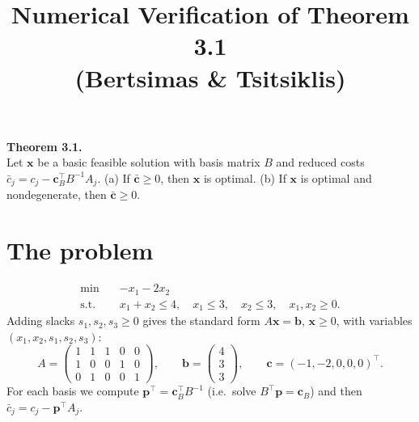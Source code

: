 \documentclass[11pt]{article}
\title{Numerical Verification of Theorem 3.1\\(Bertsimas \& Tsitsiklis)}
\date{}
\newcommand{\cb}{\bar{\mathbf c}}
\newcommand{\bx}{\mathbf x}
\begin{document}
\maketitle

\noindent\textbf{Theorem 3.1.} \\ Let $\bx$ be a basic feasible solution with basis matrix $B$ and reduced costs
$\bar c_j = c_j - \mathbf c_B^\top B^{-1}A_j$.
(a) If $\cb\ge 0$, then $\bx$ is optimal.
(b) If $\bx$ is optimal and nondegenerate, then $\cb\ge 0$.

\section{The problem}
\[
\begin{aligned}
\min\quad & -x_1 - 2x_2\\
\text{s.t.}\quad & x_1 + x_2 \le 4,\quad x_1 \le 3,\quad x_2 \le 3,\quad x_1,x_2\ge 0.
\end{aligned}
\]
Adding slacks $s_1,s_2,s_3\ge 0$ gives the standard form $A\bx=\mathbf b$, $\bx\ge 0$, with variables
$(x_1,x_2,s_1,s_2,s_3)$:
\[
A=\begin{pmatrix}1&1&1&0&0\\1&0&0&1&0\\0&1&0&0&1\end{pmatrix},\qquad
\mathbf b=\begin{pmatrix}4\\3\\3\end{pmatrix},\qquad
\mathbf c=(-1,-2,0,0,0)^\top .
\]
For each basis we compute $\mathbf p^\top=\mathbf c_B^\top B^{-1}$ (i.e.\ solve $B^\top\mathbf p=\mathbf c_B$) and then
$\bar c_j = c_j-\mathbf p^\top A_j$.
\end{document}
